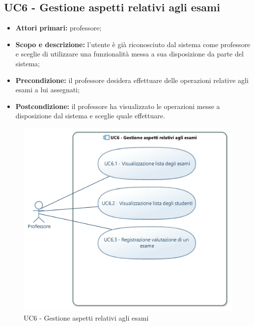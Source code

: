 \documentclass[AnalisiDeiRequisiti.tex]{subfiles}
\begin{document}
\subsection{UC6 - Gestione aspetti relativi agli esami}
\begin{itemize}
	\item \textbf{Attori primari:} professore;\\
	\item \textbf{Scopo e descrizione:} l'utente è già riconosciuto dal sistema come professore e sceglie di utilizzare una funzionalità messa a sua disposizione da parte del sistema;\\
	\item \textbf{Precondizione:} il professore desidera effettuare delle operazioni relative agli esami a lui assegnati;\\
	\item \textbf{Postcondizione:} il professore ha visualizzato le operazioni messe a disposizione dal sistema e sceglie quale effettuare.\\
\end{itemize}

\begin{figure}[H]
	\centering
	\includegraphics[width=0.8\linewidth]{UC6.jpg}
	\caption{UC6 - Gestione aspetti relativi agli esami}
	\label{fig:UC6 - Gestione aspetti relativi agli esami}
\end{figure}
\end{document}
